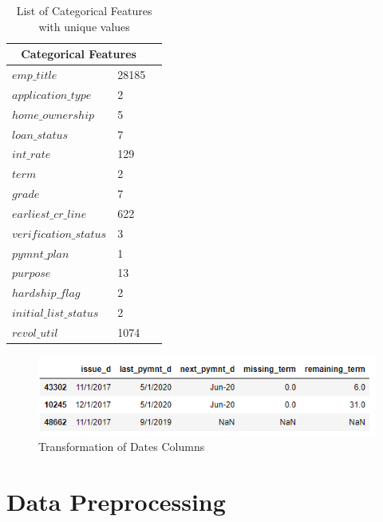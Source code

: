 \documentclass[12pt]{article}
\begin{document}
\begin{table}[h!]
	\centering
	\begin{tabular}{ |p{3cm}|p{3cm}|p{3cm}|  }
		\hline
		\multicolumn{2}{|c|}{Categorical Features} \\

		\hline
		$emp\_title$ & 28185 \\
		$application\_type$ & 2 \\
		$home\_ownership$ & 5 \\
		$loan\_status$ & 7 \\
		$int\_rate$ & 129 \\
		$term$ & 2 \\
		$grade$ & 7 \\
		$earliest\_cr\_line$ & 622 \\
		$verification\_status$ & 3 \\
		$pymnt\_plan$ & 1 \\
		$purpose$ & 13 \\
		$hardship\_flag$ & 2\\
		$initial\_list\_status$ & 2\\
		$revol\_util$ & 1074 \\
		\hline
	\end{tabular}
	\caption{List of Categorical Features with unique values}
	\label{table:1}
\end{table}


\begin{figure}[h!]
	\centering
	\includegraphics{dates.png}
	\caption{Transformation of Dates Columns}
	\label{fig:dates}
\end{figure}


\section{Data Preprocessing}
\end{document}
